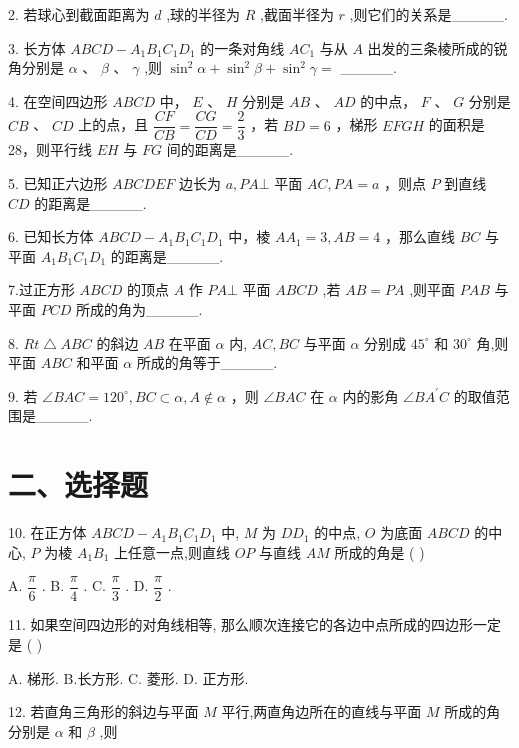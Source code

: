 2. 若球心到截面距离为 $d$ ,球的半径为 $R$ ,截面半径为 $r$ ,则它们的关系是\_\_\_\_\_.

3. 长方体 ${ABCD} - {A}_{1}{B}_{1}{C}_{1}{D}_{1}$ 的一条对角线 $A{C}_{1}$ 与从 $A$ 出发的三条棱所成的锐角分别是 $\alpha$ 、 $\beta$ 、 $\gamma$ ,则 ${\sin }^{2}\alpha  + {\sin }^{2}\beta  + {\sin }^{2}\gamma  =$ \_\_\_\_\_.

4. 在空间四边形 ${ABCD}$ 中， $E$ 、 $H$ 分别是 ${AB}$ 、 ${AD}$ 的中点， $F$ 、 $G$ 分别是 ${CB}$ 、 ${CD}$ 上的点，且 $\dfrac{CF}{CB} = \dfrac{CG}{CD} =  \dfrac{2}{3}$ ，若 ${BD} = 6$ ，梯形 ${EFGH}$ 的面积是 28，则平行线 ${EH}$ 与 ${FG}$ 间的距离是\_\_\_\_\_.

5. 已知正六边形 ${ABCDEF}$ 边长为 $a,{PA}\bot$ 平面 ${AC},{PA} = a$ ，则点 $P$ 到直线 ${CD}$ 的距离是\_\_\_\_\_.

6. 已知长方体 ${ABCD} - {A}_{1}{B}_{1}{C}_{1}{D}_{1}$ 中，棱 $A{A}_{1} = 3,{AB} = 4$ ，那么直线 ${BC}$ 与平面 ${A}_{1}{B}_{1}{C}_{1}{D}_{1}$ 的距离是\_\_\_\_\_.

7.过正方形 ${ABCD}$ 的顶点 $A$ 作 ${PA} \bot$ 平面 ${ABCD}$ ,若 ${AB} = {PA}$ ,则平面 ${PAB}$ 与平面 ${PCD}$ 所成的角为\_\_\_\_\_.

8. ${{Rt}} \bigtriangleup  {ABC}$ 的斜边 ${AB}$ 在平面 $\alpha$ 内, ${AC},{BC}$ 与平面 $\alpha$ 分别成 ${45}^{ \circ  }$ 和 ${30}^{ \circ  }$ 角,则平面 ${ABC}$ 和平面 $\alpha$ 所成的角等于\_\_\_\_\_.

9. 若 $\angle {BAC} = {120}^{ \circ  },{BC} \subset  \alpha ,A \notin  \alpha$ ，则 $\angle {BAC}$ 在 $\alpha$ 内的影角 $\angle {B{A}^{\prime }}C$ 的取值范围是\_\_\_\_\_.

\section*{二、选择题}

10. 在正方体 ${ABCD} - {A}_{1}{B}_{1}{C}_{1}{D}_{1}$ 中, $M$ 为 $D{D}_{1}$ 的中点, $O$ 为底面 ${ABCD}$ 的中心, $P$ 为棱 ${A}_{1}{B}_{1}$ 上任意一点,则直线 ${OP}$ 与直线 ${AM}$ 所成的角是 ( )

A. $\dfrac{\pi }{6}$ . B. $\dfrac{\pi }{4}$ . C. $\dfrac{\pi }{3}$ . D. $\dfrac{\pi }{2}$ .

11. 如果空间四边形的对角线相等, 那么顺次连接它的各边中点所成的四边形一定是 ( )

A. 梯形. B.长方形. C. 菱形. D. 正方形.

12. 若直角三角形的斜边与平面 $M$ 平行,两直角边所在的直线与平面 $M$ 所成的角分别是 $\alpha$ 和 $\beta$ ,则

